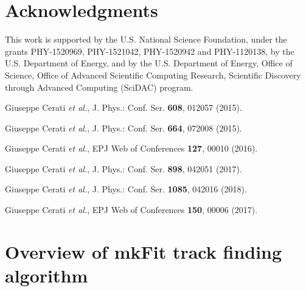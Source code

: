 \documentclass{webofc}
\def\mkfit{mkFit\xspace}
\def\etal{\emph{et al.}\xspace}
\begin{document}
\section{Acknowledgments}

This work is supported by the U.S. National Science Foundation, under the
grants PHY-1520969, PHY-1521042, PHY-1520942 and PHY-1120138, by the
U.S. Department of Energy, and by the U.S. Department of Energy, Office of
Science, Office of Advanced Scientific Computing Research, Scientific
Discovery through Advanced Computing (SciDAC) program.


\begin{thebibliography}{}

 Giuseppe Cerati \etal, J. Phys.: Conf. Ser. \textbf{608}, 012057 (2015).

 Giuseppe Cerati \etal, J. Phys.: Conf. Ser. \textbf{664}, 072008 (2015).

 Giuseppe Cerati \etal, EPJ Web of Conferences \textbf{127}, 00010 (2016).

 Giuseppe Cerati \etal, J. Phys.: Conf. Ser. \textbf{898}, 042051 (2017).

 Giuseppe Cerati \etal, J. Phys.: Conf. Ser. \textbf{1085}, 042016 (2018).

 Giuseppe Cerati \etal, EPJ Web of Conferences \textbf{150}, 00006 (2017).

  


\end{thebibliography}


\newpage
\appendix

\section{Overview of \mkfit track finding algorithm}
\label{app:track-finding-overview}
\end{document}
